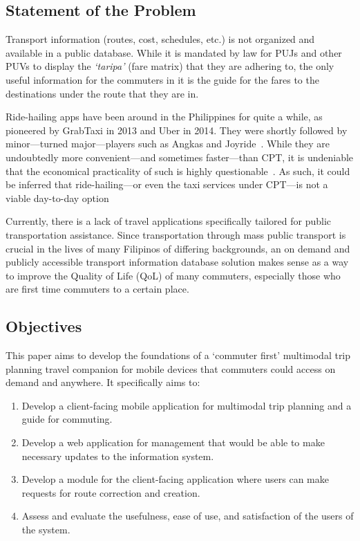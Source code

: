 \documentclass[journal]{./IEEE/IEEEtran}
\begin{document}

\subsection{Statement of the Problem}
Transport information (routes, cost, schedules, etc.) is not organized and available in a public database. While it is mandated by law for PUJs and other PUVs to display the \textit{`taripa'} (fare matrix) that they are adhering to, the only useful information for the commuters in it is the guide for the fares to the destinations under the route that they are in. 

\newpage

Ride-hailing apps have been around in the Philippines for quite a while, as pioneered by GrabTaxi in 2013 and Uber in 2014. They were shortly followed by minor---turned major---players such as Angkas and Joyride~\cite{RamizoJr19}. While they are undoubtedly more convenient---and sometimes faster---than CPT, it is undeniable that the economical practicality of such is highly questionable~\cite{RamizoJr19}.
As such, it could be inferred that ride-hailing---or even the taxi services under CPT---is not a viable day-to-day option 

Currently, there is a lack of travel applications specifically tailored for public transportation assistance.
Since transportation through mass public transport is crucial in the lives of many Filipinos of differing backgrounds, an on demand and publicly accessible transport information database solution makes sense as a way to improve the Quality of Life (QoL) of many commuters, especially those who are first time commuters to a certain place.


\subsection{Objectives}
This paper aims to develop the foundations of a `commuter first' multimodal trip planning travel companion for mobile devices that commuters could access on demand and anywhere. It specifically aims to:

\begin{enumerate}
    \item Develop a client-facing mobile application for multimodal trip planning and a guide for commuting.
    \item Develop a web application for management that would be able to make necessary updates to the information system.
    \item Develop a module for the client-facing application where users can make requests for route correction and creation.
    \item Assess and evaluate the usefulness, ease of use, and satisfaction of the users of the system.
\end{enumerate}
\end{document}
